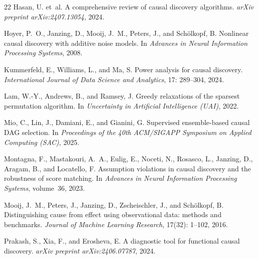\documentclass{article}
\begin{document}
\begin{thebibliography}{22}
Hasan, U. et~al.
\newblock A comprehensive review of causal discovery algorithms.
\newblock \emph{arXiv preprint arXiv:2407.13054}, 2024.

Hoyer, P.~O., Janzing, D., Mooij, J.~M., Peters, J., and Sch{\"o}lkopf, B.
\newblock Nonlinear causal discovery with additive noise models.
\newblock In \emph{Advances in Neural Information Processing Systems}, 2008.

Kummerfeld, E., Williams, L., and Ma, S.
\newblock Power analysis for causal discovery.
\newblock \emph{International Journal of Data Science and Analytics}, 17: 289--304, 2024.

Lam, W.-Y., Andrews, B., and Ramsey, J.
\newblock Greedy relaxations of the sparsest permutation algorithm.
\newblock In \emph{Uncertainty in Artificial Intelligence (UAI)}, 2022.

Mio, C., Lin, J., Damiani, E., and Gianini, G.
\newblock Supervised ensemble-based causal {DAG} selection.
\newblock In \emph{Proceedings of the 40th ACM/SIGAPP Symposium on Applied Computing (SAC)}, 2025.

Montagna, F., Mastakouri, A.~A., Eulig, E., Noceti, N., Rosasco, L., Janzing, D., Aragam, B., and Locatello, F.
\newblock Assumption violations in causal discovery and the robustness of score matching.
\newblock In \emph{Advances in Neural Information Processing Systems}, volume~36, 2023.

Mooij, J.~M., Peters, J., Janzing, D., Zscheischler, J., and Sch{\"o}lkopf, B.
\newblock Distinguishing cause from effect using observational data: methods and benchmarks.
\newblock \emph{Journal of Machine Learning Research}, 17(32): 1--102, 2016.

Prakash, S., Xia, F., and Erosheva, E.
\newblock A diagnostic tool for functional causal discovery.
\newblock \emph{arXiv preprint arXiv:2406.07787}, 2024.


\end{thebibliography}
\end{document}
